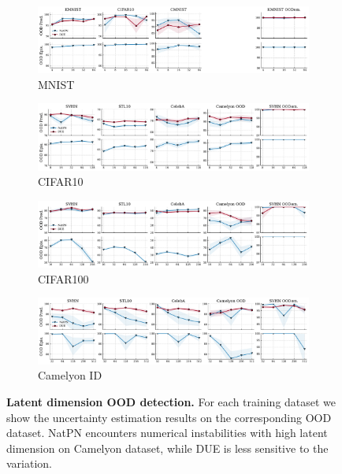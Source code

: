 

\begin{figure}[!htb]
    \centering
    \begin{subfigure}[b]{\textwidth}
        \includegraphics[width=\textwidth]{sections/008_iclr2023/figures/latent_ood_mnist.pdf}
        \caption{MNIST}
        \label{fig:latent_ood_mnist}
    \end{subfigure}
    \begin{subfigure}[b]{\textwidth}
        \includegraphics[width=\textwidth]{sections/008_iclr2023/figures/latent_ood_cifar10.pdf}
        \caption{CIFAR10}
        \label{fig:latent_ood_cifar10}
    \end{subfigure}
    \begin{subfigure}[b]{\textwidth}
        \includegraphics[width=\textwidth]{sections/008_iclr2023/figures/latent_ood_cifar100.pdf}
        \caption{CIFAR100}
        \label{fig:latent_ood_cifar100}
    \end{subfigure}
    \begin{subfigure}[b]{\textwidth}
        \includegraphics[width=\textwidth]{sections/008_iclr2023/figures/latent_ood_camelyon_id.pdf}
        \caption{Camelyon ID}
        \label{fig:latent_ood_camelyon}
    \end{subfigure}
    
    \caption{\textbf{Latent dimension OOD detection.} For each training dataset we show the uncertainty estimation results on the corresponding OOD dataset. NatPN encounters numerical instabilities with high latent dimension on Camelyon dataset, while DUE is less sensitive to the variation.}
    \label{fig:latent_ood}
\end{figure}


